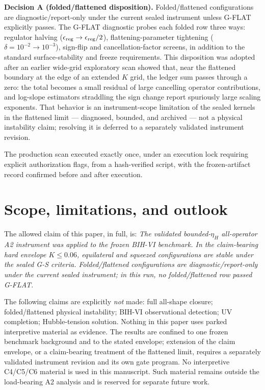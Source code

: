 \documentclass[11pt]{article}
\begin{document}
\textbf{Decision A (folded/flattened disposition).} Folded/flattened configurations are
diagnostic/report-only under the current sealed instrument unless G-FLAT explicitly passes. The
G-FLAT diagnostic probes each folded row three ways: regulator halving
($\epsilon_{\rm reg} \to \epsilon_{\rm reg}/2$), flattening-parameter tightening
($\delta = 10^{-2} \to 10^{-3}$), sign-flip and cancellation-factor screens, in addition to the
standard surface-stability and freeze requirements. This disposition was adopted after an earlier
wide-grid exploratory scan showed that, near the flattened boundary at the edge of an extended
$K$ grid, the ledger sum passes through a zero: the total becomes a small residual of large
cancelling operator contributions, and log-slope estimators straddling the sign change report
spuriously large scaling exponents. That behavior is an instrument-scope limitation of the sealed
kernels in the flattened limit --- diagnosed, bounded, and archived --- not a physical instability
claim; resolving it is deferred to a separately validated instrument revision.

The production scan executed exactly once, under an execution lock requiring explicit
authorization flags, from a hash-verified script, with the frozen-artifact record confirmed before
and after execution.



\section{Scope, limitations, and outlook}
\label{sec:scope}
The allowed claim of this paper, in full, is: \emph{The validated bounded-$\eta_H$ all-operator A2
instrument was applied to the frozen BIH-VI benchmark. In the claim-bearing hard envelope
$K \leq 0.06$, equilateral and squeezed configurations are stable under the sealed G-S criteria.
Folded/flattened configurations are diagnostic/report-only under the current sealed instrument; in
this run, no folded/flattened row passed G-FLAT.}

The following claims are explicitly \emph{not} made: full all-shape closure; folded/flattened
physical instability; BIH-VI observational detection; UV completion; Hubble-tension solution.
Nothing in this paper uses parked interpretive material as evidence. The results are confined to
one frozen benchmark background and to the stated envelope; extension of the claim envelope, or a
claim-bearing treatment of the flattened limit, requires a separately validated instrument revision
and its own gate program.
No interpretive C4/C5/C6 material is used in this manuscript. Such material remains outside the
load-bearing A2 analysis and is reserved for separate future work.
\end{document}
